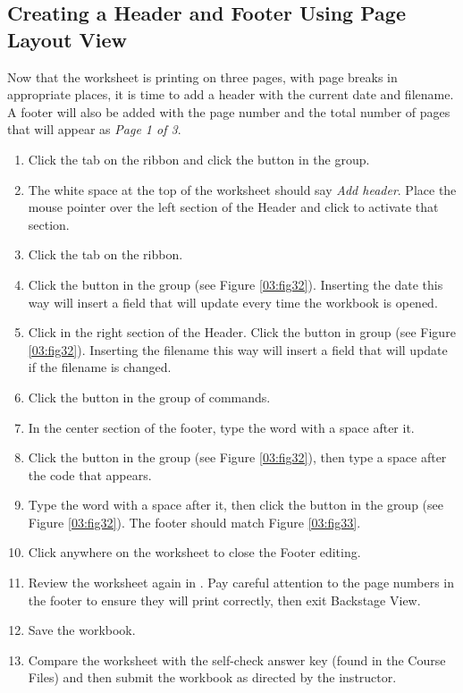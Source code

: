\subsection{Creating a Header and Footer Using Page Layout View}

Now that the worksheet is printing on three pages, with page breaks in appropriate places, it is time to add a header with the current date and filename. A footer will also be added with the page number and the total number of pages that will appear as \textit{Page 1 of 3}. 

\begin{enumerate}
	\item Click the  tab on the ribbon and click the  button in the  group.
	\item The white space at the top of the worksheet should say \textit{Add header}. Place the mouse pointer over the left section of the Header and click to activate that section.
	\item Click the  tab on the ribbon.
	\item Click the  button in the  group (see Figure \ref{03:fig32}). Inserting the date this way will insert a field that will update every time the workbook is opened.
	\item Click in the right section of the Header. Click the  button in  group (see Figure \ref{03:fig32}). Inserting the filename this way will insert a field that will update if the filename is changed.
	\item Click the  button in the  group of commands.
	\item In the center section of the footer, type the word  with a space after it.
	\item Click the  button in the  group (see Figure \ref{03:fig32}), then type a space after the \fmtTyping{\&[Page]} code that appears.
	\item Type the word  with a space after it, then click the  button in the  group (see Figure \ref{03:fig32}). The footer should match Figure \ref{03:fig33}.
	\item Click anywhere on the worksheet to close the Footer editing.
	\item Review the worksheet again in . Pay careful attention to the page numbers in the footer to ensure they will print correctly, then exit Backstage View.
	\item Save the  workbook.
	\item Compare the worksheet with the self-check answer key (found in the Course Files) and then submit the  workbook as directed by the instructor.
\end{enumerate}

